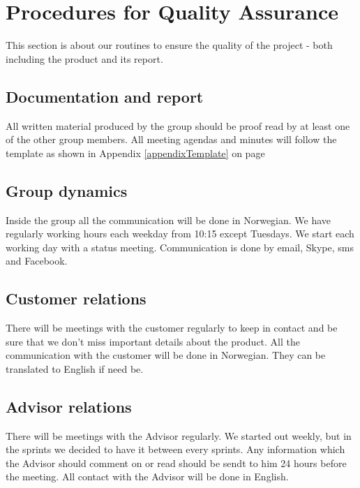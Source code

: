 \section{Procedures for Quality Assurance}
This section is about our routines to ensure the quality of the project - both including the product and its report. 

\subsection{Documentation and report}
All written material produced by the group should be proof read by at least one of the other group members. All meeting agendas and minutes will follow the template as shown in Appendix \ref{appendixTemplate} on page \pageref{appendixTemplate}


\subsection{Group dynamics}
Inside the group all the communication will be done in Norwegian. We have regularly working hours each weekday from 10:15 except Tuesdays. We start each working day with a status meeting. 
Communication is done by email, Skype, sms and Facebook. 

\subsection{Customer relations}
There will be meetings with the customer regularly to keep in contact and be sure that we don't miss important details about the product. All the communication with the customer will be done in Norwegian. They can be translated to English if need be.


\subsection{Advisor relations}
There will be meetings with the Advisor regularly. We started out weekly, but in the sprints we decided to have it between every sprints. Any information which the Advisor should comment on or read should be sendt to him 24 hours before the meeting. All contact with the Advisor will be done in English. 